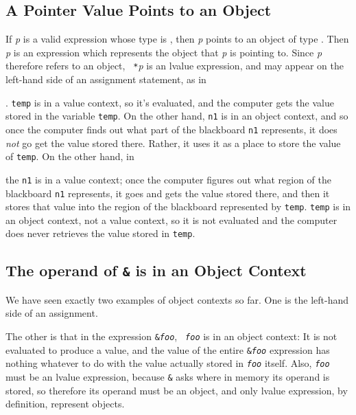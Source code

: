\subsection{ A Pointer Value Points to an Object}

If {\em p}\/ is a valid expression whose type is , then
{\em p}\/ points to an object of type . Then {\tt *}{\em
p}\/ is an expression which represents the object that {\em p}\/ is
pointing to.  Since {\tt *}{\em p}\/ therefore refers to an object, {\tt
*}{\em p}\/ is an lvalue expression, and may appear on the left-hand
side of an assignment statement, as in

\begin{flushleft}
\verb% *n1 = temp ;  %
\end{flushleft}

\noindent .  {\tt temp} is in a value context, so it's evaluated, and
the computer gets the value stored in the variable {\tt temp}.  On the
other hand, {\tt *n1} is in an object context, and so once the computer
finds out what part of the blackboard {\tt *n1} represents, it does {\em
not} go get the value stored there.  Rather, it uses it as a place to
store the value of {\tt temp}.  On the other hand, in

\begin{flushleft}
\verb% temp = *n1 ; %
\end{flushleft}

\noindent the {\tt *n1} is in a value context;  once the computer
figures out what region of the blackboard {\tt *n1} represents, it goes
and gets the value stored there, and then it stores that value into the
region of the blackboard represented by {\tt temp}.  {\tt temp} is in an
object context, not a value context, so it is not evaluated and the
computer does never retrieves the value stored in {\tt temp}.

\subsection{ The operand of {\tt\&} is in an Object Context}

We have seen exactly two examples of object contexts so far.  One is the
left-hand side of an assignment.

The other is that in the expression {\tt \&{\em foo}\/}, {\tt {\em
foo}\/} is in an object context: It is not evaluated to produce a value,
and the value of the entire {\tt \&{\em foo}\/} expression has nothing
whatever to do with the value actually stored in {\tt {\em foo}\/}
itself.  Also, {\tt {\em foo}\/} must be an lvalue expression, because
{\tt\&} asks where in memory its operand is stored, so therefore its
operand must be an object, and only lvalue expression, by definition,
represent objects.

